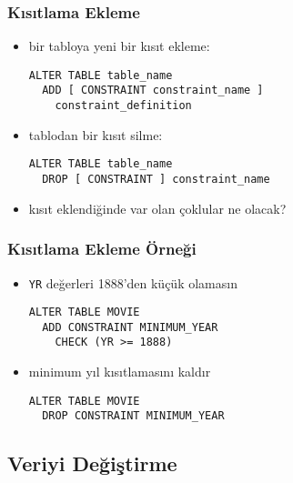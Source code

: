 \documentclass[dvipsnames]{beamer}
\theoremstyle{plain}
\begin{document}
\begin{frame}[fragile]
  \frametitle{Kısıtlama Ekleme}
  
  \begin{itemize}
    \item bir tabloya yeni bir kısıt ekleme:
    \begin{lstlisting}
ALTER TABLE table_name
  ADD [ CONSTRAINT constraint_name ]
    constraint_definition
    \end{lstlisting}

   \item tablodan bir kısıt silme:
    \begin{lstlisting}
ALTER TABLE table_name
  DROP [ CONSTRAINT ] constraint_name
    \end{lstlisting}

    \pause
    \item kısıt eklendiğinde var olan çoklular ne olacak?
  \end{itemize}
\end{frame}

\begin{frame}[fragile]
  \frametitle{Kısıtlama Ekleme Örneği}
  
  \begin{itemize}
    \item \texttt{YR} değerleri 1888'den küçük olamasın
    \begin{lstlisting}
ALTER TABLE MOVIE
  ADD CONSTRAINT MINIMUM_YEAR
    CHECK (YR >= 1888)
    \end{lstlisting}
  \end{itemize}

  \begin{itemize}
    \item minimum yıl kısıtlamasını kaldır
    \begin{lstlisting}
ALTER TABLE MOVIE
  DROP CONSTRAINT MINIMUM_YEAR
    \end{lstlisting}
  \end{itemize}
\end{frame}

\subsection{Veriyi Değiştirme}
\end{document}
